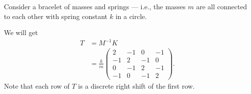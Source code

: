 \documentclass[10pt]{mypackage}
\begin{document}
\begin{example}[A Bracelet]
  Consider a bracelet of masses and springs --- i.e., the masses $m$ are all connected to each other with spring constant $k$ in a circle.\newline

  We will get
  \begin{align*}
    T &= M^{-1} K\\
      &= \frac{k}{m} \begin{pmatrix}2 & -1 & 0 & -1 \\ -1 & 2 & -1 & 0 \\ 0 & -1 & 2 & -1 \\ -1 & 0 & -1 & 2\end{pmatrix}.
  \end{align*}
  Note that each row of $T$ is a discrete right shift of the first row.\newline


\end{example}
\end{document}

